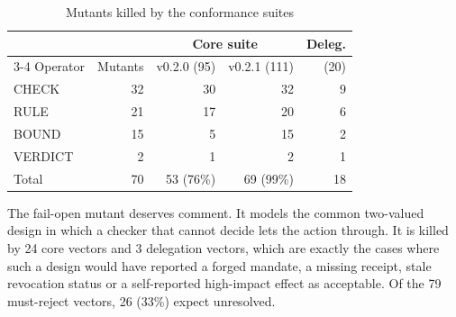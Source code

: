 \documentclass[conference]{IEEEtran}
\newcommand{\unres}{\textsf{unresolved}}
\begin{document}
\begin{table}[t]
\caption{Mutants killed by the conformance suites}\label{tab:mut}
\centering\small
\begin{tabular}{@{}lrrrr@{}}
\toprule
& & \multicolumn{2}{c}{Core suite} & Deleg. \\
\cmidrule(lr){3-4}
Operator & Mutants & v0.2.0 (95) & v0.2.1 (111) & (20) \\
\midrule
CHECK & 32 & 30 & 32 & 9 \\
RULE & 21 & 17 & 20 & 6 \\
BOUND & 15 & 5 & 15 & 2 \\
VERDICT & 2 & 1 & 2 & 1 \\
\midrule
Total & 70 & 53 (76\%) & 69 (99\%) & 18 \\
\bottomrule
\end{tabular}
\end{table}

The fail-open mutant deserves comment. It models the common two-valued design in which a checker that cannot decide lets the action through. It is killed by 24 core vectors and 3 delegation vectors, which are exactly the cases where such a design would have reported a forged mandate, a missing receipt, stale revocation status or a self-reported high-impact effect as acceptable. Of the 79 must-reject vectors, 26 (33\%) expect \unres{}.
\end{document}
